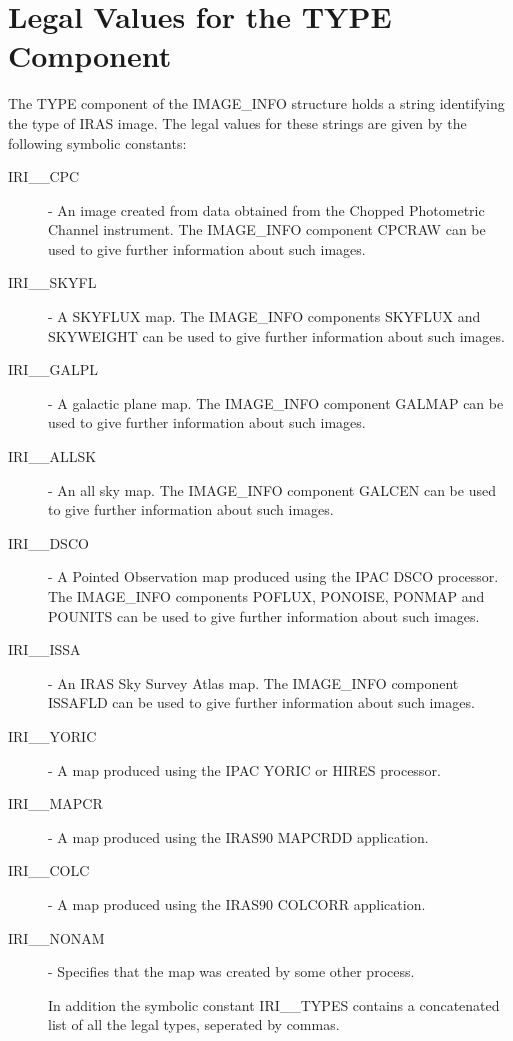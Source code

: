 \section{Legal Values for the TYPE Component}
\label{APP:TYPE}
The TYPE component of the IMAGE\_INFO structure holds a string identifying the
type of IRAS image. The legal values for these strings are given by the
following symbolic constants:
\begin{description}

\item [IRI\_\_CPC] - An image created from data obtained from the Chopped
Photometric Channel instrument. The IMAGE\_INFO component CPCRAW can be used to
give further information about such images.

\item [IRI\_\_SKYFL] - A SKYFLUX map. The IMAGE\_INFO components SKYFLUX and
SKYWEIGHT can be used to give further information about such images.

\item [IRI\_\_GALPL] - A galactic plane map. The IMAGE\_INFO component GALMAP
can be used to give further information about such images.

\item [IRI\_\_ALLSK] - An all sky  map. The IMAGE\_INFO component GALCEN can be
used to give further information about such images.

\item [IRI\_\_DSCO] - A Pointed Observation map produced using the IPAC DSCO
processor. The IMAGE\_INFO components POFLUX, PONOISE, PONMAP and POUNITS can be
used to give further information about such images.

\item [IRI\_\_ISSA] - An IRAS Sky Survey Atlas map. The IMAGE\_INFO component
ISSAFLD can be used to give further information about such images.

\item [IRI\_\_YORIC] - A map produced using the IPAC YORIC or HIRES processor.

\item [IRI\_\_MAPCR] - A map produced using the IRAS90 MAPCRDD application.

\item [IRI\_\_COLC] - A map produced using the IRAS90 COLCORR application.

\item [IRI\_\_NONAM] - Specifies that the map was created by some other process.

In addition the symbolic constant IRI\_\_TYPES contains a concatenated list of
all the legal types, seperated by commas.

\end{description}

